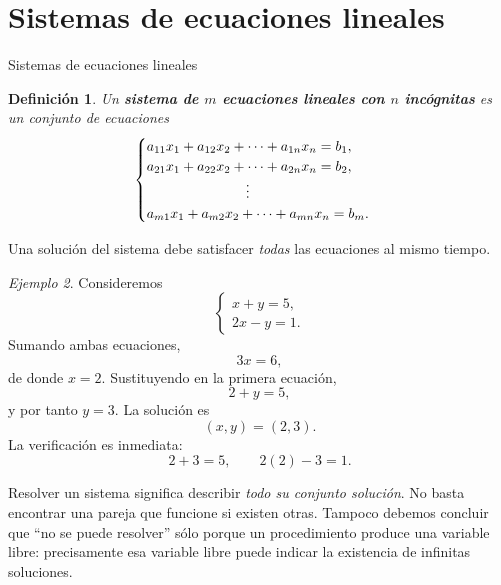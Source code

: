 \documentclass[aspectratio=169,9pt]{beamer}
\newtheorem{definicion}{Definición}[section]
\theoremstyle{remark}
\newtheorem{ejemplo}[definicion]{Ejemplo}
\begin{document}
\section{Sistemas de ecuaciones lineales}
\begin{frame}[allowframebreaks,t]{Sistemas de ecuaciones lineales}
\begin{definicion}
Un \textbf{sistema de $m$ ecuaciones lineales con $n$ incógnitas} es un conjunto de ecuaciones
\[
\begin{cases}
a_{11}x_1+a_{12}x_2+\cdots+a_{1n}x_n=b_1,\\
a_{21}x_1+a_{22}x_2+\cdots+a_{2n}x_n=b_2,\\
\hspace{2.5cm}\vdots\\
a_{m1}x_1+a_{m2}x_2+\cdots+a_{mn}x_n=b_m.
\end{cases}
\]
\end{definicion}

Una solución del sistema debe satisfacer \emph{todas} las ecuaciones al mismo tiempo.

\begin{ejemplo}
Consideremos
\[
\begin{cases}
x+y=5,\\
2x-y=1.
\end{cases}
\]
Sumando ambas ecuaciones,
\[
3x=6,
\]
de donde $x=2$. Sustituyendo en la primera ecuación,
\[
2+y=5,
\]
y por tanto $y=3$. La solución es
\[
(x,y)=(2,3).
\]
La verificación es inmediata:
\[
2+3=5,\qquad 2(2)-3=1.
\]
\end{ejemplo}

\par{}\par\smallskip

Resolver un sistema significa describir \emph{todo su conjunto solución}. No basta encontrar una pareja
que funcione si existen otras. Tampoco debemos concluir que ``no se puede resolver'' sólo porque un
procedimiento produce una variable libre: precisamente esa variable libre puede indicar la existencia
de infinitas soluciones.
\end{frame}
\end{document}
